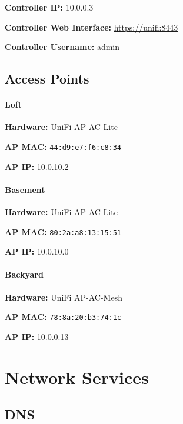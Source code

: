 \documentclass[]{article}
\let\oldparagraph\paragraph
\renewcommand{\paragraph}[1]{\oldparagraph{#1}\mbox{}}
\begin{document}
\textbf{Controller IP: }
{10.0.0.3}

\textbf{Controller Web Interface: }
{\href{https://www.google.com/url?q=https://unifi:8443\&sa=D\&ust=1544293199842000}{https://unifi:8443}}

\textbf{Controller Username: }
{admin}

\subsection{\texorpdfstring{{Access Points}}{Access Points}}

\paragraph{\texorpdfstring{{Loft}}{Loft}}

\textbf{Hardware: }
{UniFi AP-AC-Lite}

\textbf{AP MAC: }
\texttt{44:d9:e7:f6:c8:34}

\textbf{AP IP: }
{10.0.10.2}

\paragraph{\texorpdfstring{{Basement}}{Basement}}

\textbf{Hardware: }
{UniFi AP-AC-Lite}

\textbf{AP MAC: }
\texttt{80:2a:a8:13:15:51}

\textbf{AP IP: }
{10.0.10.0}

\paragraph{\texorpdfstring{{Backyard}}{Backyard}}

\textbf{Hardware: }
{UniFi AP-AC-Mesh}

\textbf{AP MAC: }
\texttt{78:8a:20:b3:74:1c}

\textbf{AP IP: }
{10.0.0.13}


\newpage

\vspace{\baselineskip}\section*{Network Services}

\subsection{\texorpdfstring{{DNS}}{DNS}}
\end{document}
